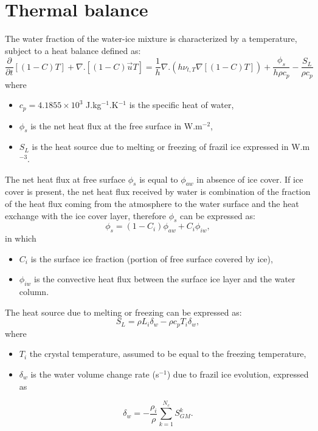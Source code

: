 \section{Thermal balance}
\label{thermal_balance}

The water fraction of the water-ice mixture is characterized
by a temperature, subject to a heat balance defined as:
\begin{equation}
\frac{\partial }{\partial t} \left[ (1-C)T \right]  + \nabla. \left[ (1-C) \vec{u} T \right]  = \dfrac{1}{h}  \nabla .(h \nu_{t,T} \nabla \left[ (1-C) T \right] ) +\frac{\phi_s }{h \rho c_{p}} - \frac{S_{L}}{\rho c_{p}}
\label{eq:model:temperature_water_phase}
\end{equation}
where
\begin{itemize}
	\item $c_{p}= 4.1855 \times 10^3$ J.kg$^{-1}$.K$^{-1}$ is the specific heat of water,
	\item $\phi_s$ is the net heat flux at the free surface in W.m$^{-2}$,
	\item $S_{L}$ is the heat source due to melting or freezing of frazil ice expressed in W.m$^{-3}$.
\end{itemize}

The net heat flux at free surface $\phi_s$ is equal to $\phi_{aw}$ in absence of ice cover.
If ice cover is present, the net heat flux received by water is combination of the fraction of
the heat flux coming from the atmosphere to the water surface and the heat exchange with the ice cover layer,
therefore $\phi_s$ can be expressed as:
\begin{equation}\label{heat_fluxes_water}
\phi_s = (1-C_i) \phi_{aw} + C_i \phi_{iw},
\end{equation}
in which
\begin{itemize}
	\item $C_i$ is the surface ice fraction (portion of free surface covered by ice),
	\item $\phi_{iw}$ is the convective heat flux between the surface ice layer and the water column.
\end{itemize}
The heat source due to melting or freezing can be expressed as:
\begin{equation}
S_{L}= \rho L_i \delta_w - \rho c_p T_i \delta_w,
\end{equation}
where
\begin{itemize}
	\item $T_i$ the crystal temperature, assumed to be equal to the freezing temperature,
	\item $\delta_w$ is the water volume change rate (s$^{-1}$) due to frazil ice evolution,  expressed as
\end{itemize}
\begin{equation}
\delta_w = - \frac{\rho_i}{\rho} \sum_{k=1}^{N_c} S^k_{GM}.
\label{eq:dw}
\end{equation}


